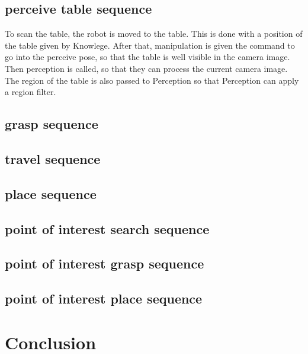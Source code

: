 \documentclass[main.tex]{subfiles}
\begin{document}
	\subsection{perceive table sequence}
	To scan the table, the robot is moved to the table. This is done with a position of the table given by Knowlege. After that, manipulation is given the command to go into the perceive pose, so that the table is well visible in the camera image. Then perception is called, so that they can process the current camera image. The region of the table is also passed to Perception so that Perception can apply a region filter.

	\subsection{grasp sequence}
	\subsection{travel sequence}
	\subsection{place sequence}
	\subsection{point of interest search sequence}
	\subsection{point of interest grasp sequence}
	\subsection{point of interest place sequence}


		
		\section{Conclusion}
		
		
	\endgroup
\end{document}
